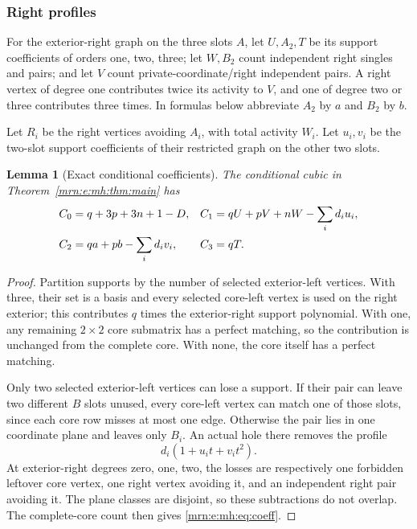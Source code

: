\documentclass[11pt,a4paper]{article}
\newtheorem{lemma}[theorem]{Lemma}
\theoremstyle{remark}\newtheorem{remark}[theorem]{Remark}
\begin{document}
\subsubsection{Right profiles}
For the exterior-right graph on the three slots $A$, let $U,A_2,T$ be its support coefficients of orders one, two, three; let $W,B_2$ count independent right singles and pairs; and let $V$ count private-coordinate/right independent pairs. A right vertex of degree one contributes twice its activity to $V$, and one of degree two or three contributes three times. In formulas below abbreviate $A_2$ by $a$ and $B_2$ by $b$.

Let $R_i$ be the right vertices avoiding $A_i$, with total activity $W_i$. Let $u_i,v_i$ be the two-slot support coefficients of their restricted graph on the other two slots.

\begin{lemma}[Exact conditional coefficients]\label{mrn:e:mh:lem:count}
The conditional cubic in Theorem~\ref{mrn:e:mh:thm:main} has
\begin{align}
 C_0&=q+3p+3n+1-D,&
 C_1&=qU+pV+nW-\sum_i d_i u_i,\label{mrn:e:mh:eq:coeff}\\
 C_2&=qa+pb-\sum_i d_i v_i,&
 C_3&=qT.\notag
\end{align}
\end{lemma}
\begin{proof}
Partition supports by the number of selected exterior-left vertices. With three, their set is a basis and every selected core-left vertex is used on the right exterior; this contributes $q$ times the exterior-right support polynomial. With one, any remaining $2\times2$ core submatrix has a perfect matching, so the contribution is unchanged from the complete core. With none, the core itself has a perfect matching.

Only two selected exterior-left vertices can lose a support. If their pair can leave two different $B$ slots unused, every core-left vertex can match one of those slots, since each core row misses at most one edge. Otherwise the pair lies in one coordinate plane and leaves only $B_i$. An actual hole there removes the profile
\[
 d_i(1+u_i t+v_i t^2).
\]
At exterior-right degrees zero, one, two, the losses are respectively one forbidden leftover core vertex, one right vertex avoiding it, and an independent right pair avoiding it. The plane classes are disjoint, so these subtractions do not overlap. The complete-core count \cite{b:m43} then gives \eqref{mrn:e:mh:eq:coeff}.
\end{proof}
\end{document}
